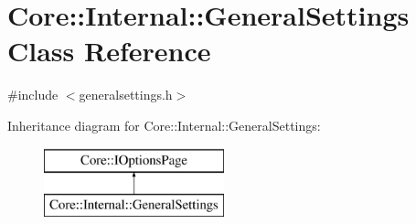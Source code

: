 \hypertarget{class_core_1_1_internal_1_1_general_settings}{\section{\-Core\-:\-:\-Internal\-:\-:\-General\-Settings \-Class \-Reference}
\label{class_core_1_1_internal_1_1_general_settings}
}


{\ttfamily \#include $<$generalsettings.\-h$>$}

\-Inheritance diagram for \-Core\-:\-:\-Internal\-:\-:\-General\-Settings\-:\begin{figure}[H]
\begin{center}
\leavevmode
\includegraphics[height=2.000000cm]{class_core_1_1_internal_1_1_general_settings}
\end{center}
\end{figure}
